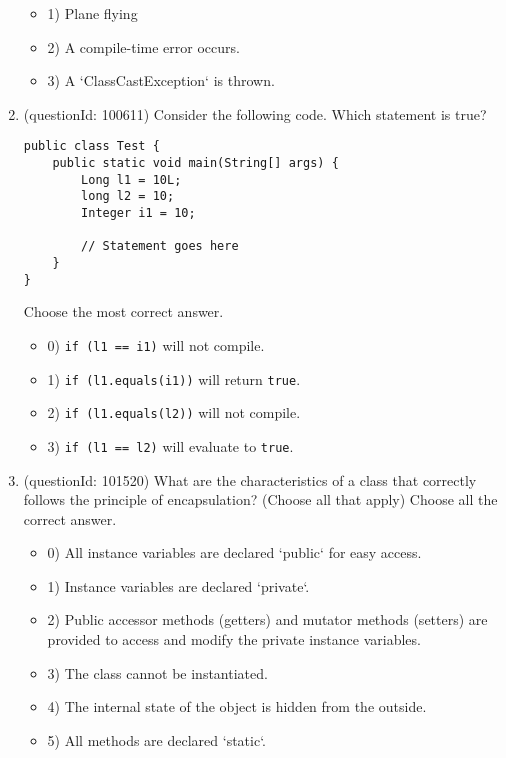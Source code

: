 \documentclass[12pt]{article}
\begin{document}
\begin{enumerate}[label=(\arabic*)]
\begin{itemize}
\item 1) Plane flying

\item 2) A compile-time error occurs.

\item 3) A `ClassCastException` is thrown.

\end{itemize}
\item (questionId: 100611) Consider the following code. Which statement is true?\n\begin{verbatim}
public class Test {
    public static void main(String[] args) {
        Long l1 = 10L;
        long l2 = 10;
        Integer i1 = 10;

        // Statement goes here
    }
}
\end{verbatim}
Choose the most correct answer. 
\begin{itemize}
\item 0) \verb|if (l1 == i1)| will not compile.

\item 1) \verb|if (l1.equals(i1))| will return \verb|true|.

\item 2) \verb|if (l1.equals(l2))| will not compile.

\item 3) \verb|if (l1 == l2)| will evaluate to \verb|true|.

\end{itemize}
\item (questionId: 101520) What are the characteristics of a class that correctly follows the principle of encapsulation? (Choose all that apply)
Choose all the correct answer.\begin{itemize}
\item 0) All instance variables are declared `public` for easy access.

\item 1) Instance variables are declared `private`.

\item 2) Public accessor methods (getters) and mutator methods (setters) are provided to access and modify the private instance variables.

\item 3) The class cannot be instantiated.

\item 4) The internal state of the object is hidden from the outside.

\item 5) All methods are declared `static`.


\end{itemize}
\end{enumerate}
\end{document}
